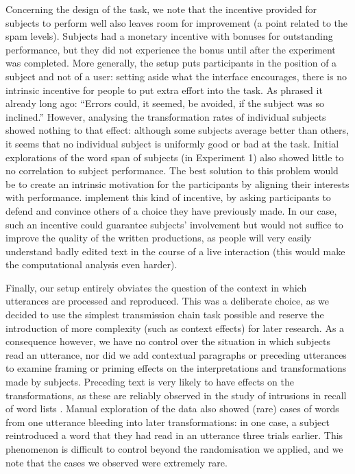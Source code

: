 \documentclass[a4paper,fleqn]{cas-dc}
\begin{document}
Concerning the design of the task, we note that the incentive provided
for subjects to perform well also leaves room for improvement (a point
related to the spam levels). Subjects had a monetary incentive with
bonuses for outstanding performance, but they did not experience the
bonus until after the experiment was completed. More generally, the
setup puts participants in the position of a subject and not of a user:
setting aside what the interface encourages, there is no intrinsic
incentive for people to put extra effort into the task. As
\citet{gauld_experiments_1967} phrased it already long ago:
\enquote{Errors could, it seemed, be avoided, if the subject was so
inclined.} However, analysing the transformation rates of individual
subjects showed nothing to that effect: although some subjects average
better than others, it seems that no individual subject is uniformly
good or bad at the task. Initial explorations of the word span of
subjects (in Experiment 1) also showed little to no correlation to
subject performance. The best solution to this problem would be to
create an intrinsic motivation for the participants by aligning their
interests with performance. \citet{claidiere_argumentation_2017}
implement this kind of incentive, by asking participants to defend and
convince others of a choice they have previously made. In our case, such
an incentive could guarantee subjects' involvement but would not suffice
to improve the quality of the written productions, as people will very
easily understand badly edited text in the course of a live interaction
(this would make the computational analysis even harder).

Finally, our setup entirely obviates the question of the context in
which utterances are processed and reproduced. This was a deliberate
choice, as we decided to use the simplest transmission chain task
possible and reserve the introduction of more complexity (such as
context effects) for later research. As a consequence however, we have
no control over the situation in which subjects read an utterance, nor
did we add contextual paragraphs or preceding utterances to examine
framing or priming effects on the interpretations and transformations
made by subjects. Preceding text is very likely to have effects on the
transformations, as these are reliably observed in the study of
intrusions in recall of word lists \citep{zaromb_temporal_2006}.
Manual exploration of the data also showed (rare) cases of words from
one utterance bleeding into later transformations: in one case, a
subject reintroduced a word that they had read in an utterance three
trials earlier. This phenomenon is difficult to control beyond the
randomisation we applied, and we note that the cases we observed were
extremely rare.
\end{document}
